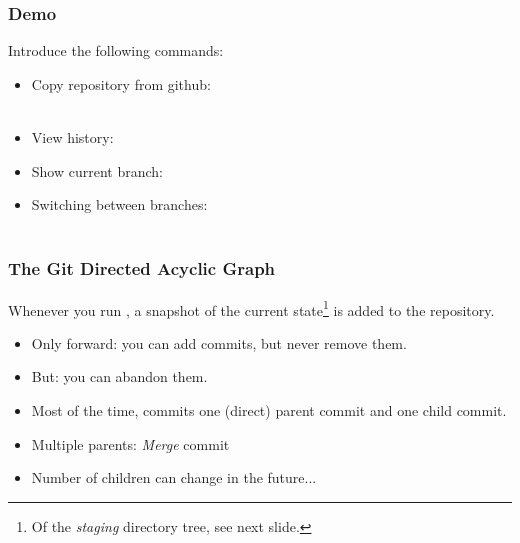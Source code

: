 \begin{frame}
  \frametitle{Demo}
  
  Introduce the following commands:
  \begin{itemize}
  \item 
    Copy repository from github:\\
    \\\hfill
  \item View history:\\
  \item Show current branch:\\
  \item Switching between branches:\\
    \\
  \end{itemize}
\end{frame}


\begin{frame}
  \frametitle{The Git Directed Acyclic Graph}

  Whenever you run , a snapshot of the current
  state\footnote{Of the \emph{staging} directory tree, see next
    slide.} is added to the repository.
  \begin{itemize}
  \item Only forward: you can add commits, but never remove them.
  \item But: you can abandon them.
  \item Most of the time, commits one (direct) parent commit and one
    child commit.
  \item Multiple parents: \emph{Merge} commit
  \item Number of children can change in the future...
  \end{itemize}
\end{frame}


{
  \begin{frame}[plain]
  \end{frame}
}


